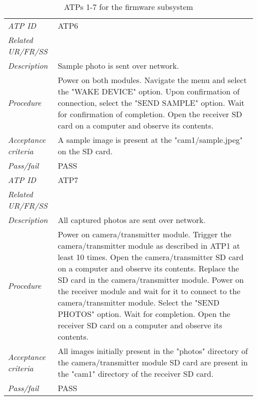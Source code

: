 \documentclass[class=report,11pt,crop=false]{standalone}
\begin{document}
\begin{table}[!ht]
\begin{scriptsize}
\begin{tabularx}{\textwidth}{|p{} X|}
        \textit{ATP ID} & ATP6\\
        \textit{Related UR/FR/SS} & \\
        \textit{Description} & Sample photo is sent over network.\\
        \textit{Procedure} & Power on both modules. Navigate the menu and select the "WAKE DEVICE" option. Upon confirmation of connection, select the "SEND SAMPLE" option. Wait for confirmation of completion. Open the receiver SD card on a computer and observe its contents.\\
        \textit{Acceptance criteria} & A sample image is present at the "cam1/sample.jpeg" on the SD card. \\ 
        \textit{Pass/fail} & PASS \\ \hline

        \textit{ATP ID} & ATP7 \\
        \textit{Related UR/FR/SS} & \\
        \textit{Description} & All captured photos are sent over network.\\
        \textit{Procedure} & Power on camera/transmitter module. Trigger the camera/transmitter module as described in ATP1 at least 10 times. Open the camera/transmitter SD card on a computer and observe its contents. Replace the SD card in the camera/transmitter module. Power on the receiver module and wait for it to connect to the camera/transmitter module. Select the "SEND PHOTOS" option. Wait for completion. Open the receiver SD card on a computer and observe its contents.\\
        \textit{Acceptance criteria} & All images initially present in the "photos" directory of the camera/transmitter module SD card are present in the "cam1" directory of the receiver SD card.\\ 
        \textit{Pass/fail} & PASS \\ \hline
        

    \end{tabularx}
    \end{scriptsize}
    \caption{ATPs 1-7 for the firmware subsystem}
    \label{tab:firmware-atps1}
\end{table}
\end{document}
